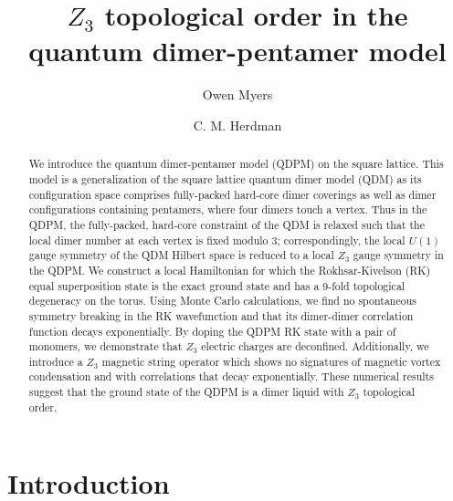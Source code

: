 \documentclass[twocolumn,prb,aps,floatfix,superscriptaddress]{revtex4-1}
\begin{document}
\title{$Z_3$ topological order in the quantum dimer-pentamer model}

\author{Owen Myers}

\author{C. M. Herdman}

\begin{abstract}
We introduce the quantum dimer-pentamer model (QDPM) on the square lattice. This model is a generalization of the square lattice quantum dimer model (QDM) as its configuration space comprises fully-packed hard-core dimer coverings as well as dimer configurations containing pentamers, where four dimers touch a vertex. Thus in the QDPM, the fully-packed, hard-core constraint of the QDM is relaxed such that the local dimer number at each vertex is fixed modulo 3; correspondingly, the local $U(1)$ gauge symmetry of the QDM Hilbert space is reduced to a local $Z_3$ gauge symmetry in the QDPM. We construct a local Hamiltonian for which the Rokhsar-Kivelson (RK) equal superposition state is the exact ground state and has a 9-fold topological degeneracy on the torus. Using Monte Carlo calculations, we find no spontaneous symmetry breaking in the RK wavefunction and that its dimer-dimer correlation function decays exponentially. By doping the QDPM RK state with a pair of monomers, we demonstrate that $Z_3$ electric charges are deconfined. Additionally, we introduce a $Z_3$ magnetic string operator which shows no signatures of magnetic vortex condensation and with correlations that decay exponentially. These numerical results suggest that the ground state of the QDPM is a dimer liquid with $Z_3$ topological order.
\end{abstract}

\maketitle

\section{Introduction}
\end{document}
